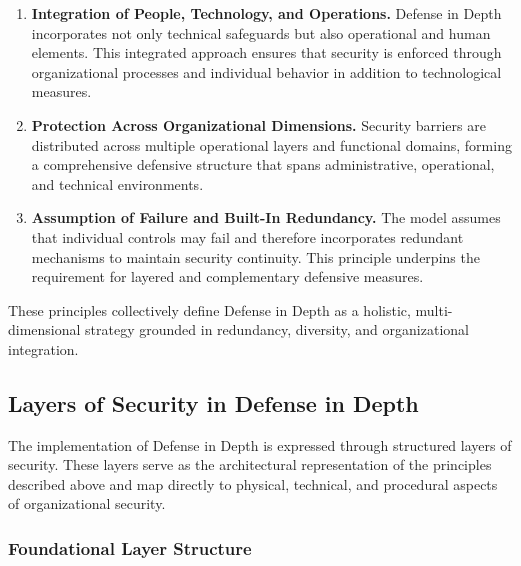 \begin{TNtwocol}
\begin{enumerate}
                  \smallskip

            \item \textbf{Integration of People, Technology, and Operations.}
                  Defense in Depth incorporates not only technical safeguards but also operational and human elements. This integrated approach ensures that security is enforced through organizational processes and individual behavior in addition to technological measures.\cite{NSA_Defense_In_Depth,ISO_27002_2022}

                  \smallskip

            \item \textbf{Protection Across Organizational Dimensions.}
                  Security barriers are distributed across multiple operational layers and functional domains, forming a comprehensive defensive structure that spans administrative, operational, and technical environments.\cite{NIST_SP800_12R1}

                  \smallskip

            \item \textbf{Assumption of Failure and Built-In Redundancy.}
                  The model assumes that individual controls may fail and therefore incorporates redundant mechanisms to maintain security continuity. This principle underpins the requirement for layered and complementary defensive measures.\cite{NIST_SP800_207}
      \end{enumerate}

      \medskip

      These principles collectively define Defense in Depth as a holistic, multi-dimensional strategy grounded in redundancy, diversity, and organizational integration.

      \subsection{Layers of Security in Defense in Depth}

      \medskip

      The implementation of Defense in Depth is expressed through structured layers of security. These layers serve as the architectural representation of the principles described above and map directly to physical, technical, and procedural aspects of organizational security.

      \subsubsection{Foundational Layer Structure}


\end{TNtwocol}
